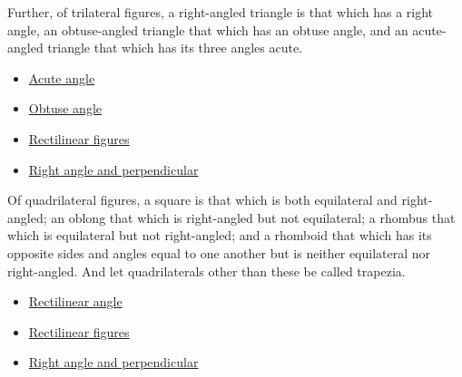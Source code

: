 \begin{definition}
\label{def:euclid-triangle-angle-classes}
Further, of trilateral figures, a right-angled triangle is that which has a
right angle, an obtuse-angled triangle that which has an obtuse angle, and an
acute-angled triangle that which has its three angles acute.
\end{definition}
\begin{lra-not-visible}
\begin{dependencies}
\begin{itemize}
  \item \hyperref[def:euclid-acute-angle]{Acute angle}
  \item \hyperref[def:euclid-obtuse-angle]{Obtuse angle}
  \item \hyperref[def:euclid-rectilinear-figures]{Rectilinear figures}
  \item \hyperref[def:euclid-right-angle-and-perpendicular]{Right angle and perpendicular}
\end{itemize}
\end{dependencies}
\end{lra-not-visible}

\begin{definition}
\label{def:euclid-quadrilateral-classes}
Of quadrilateral figures, a square is that which is both equilateral and
right-angled; an oblong that which is right-angled but not equilateral; a
rhombus that which is equilateral but not right-angled; and a rhomboid that
which has its opposite sides and angles equal to one another but is neither
equilateral nor right-angled. And let quadrilaterals other than these be called
trapezia.
\end{definition}
\begin{lra-not-visible}
\begin{dependencies}
\begin{itemize}
  \item \hyperref[def:euclid-rectilinear-angle]{Rectilinear angle}
  \item \hyperref[def:euclid-rectilinear-figures]{Rectilinear figures}
  \item \hyperref[def:euclid-right-angle-and-perpendicular]{Right angle and perpendicular}
\end{itemize}
\end{dependencies}
\end{lra-not-visible}

